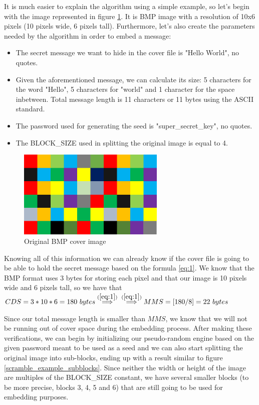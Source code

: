 \begin{multicols*}{2}
It is much easier to explain the algorithm using a simple example, so let's begin with the image represented in figure \ref{scramble_example_original_image}. It is BMP image with a resolution of 10x6 pixels (10 pixels wide, 6 pixels tall). Furthermore, let's also create the parameters needed by the algorithm in order to embed a message:
\begin{itemize}
  \item The secret message we want to hide in the cover file is "Hello World", no quotes.
  \item Given the aforementioned message, we can calculate its size: 5 characters for the word "Hello", 5 characters for "world" and 1 character for the space inbetween. Total message length is 11 characters or 11 bytes using the ASCII standard. 
  \item The password used for generating the seed is "super\_secret\_key", no quotes.
  \item The BLOCK\_SIZE used in splitting the original image is equal to 4.
\end{itemize}

\begin{figure}[H]
    \centering
    \includegraphics[width=7cm,keepaspectratio]{pics/bmp_scrambling/original_image}
    \caption{Original BMP cover image}
    \label{scramble_example_original_image}
\end{figure}

Knowing all of this information we can already know if the cover file is going to be able to hold the secret message based on the formula \ref{eq:1}. We know that the BMP format uses 3 bytes for storing each pixel and that our image is 10 pixels wide and 6 pixels tall, so we have that 
\\$CDS=3*10*6=180\ bytes \overset{(\ref{eq:1})}{ \implies }\\ \overset{(\ref{eq:1})}{ \implies } MMS=[180/8]=22\ bytes$

Since our total message length is smaller than $MMS$, we know that we will not be running out of cover space during the embedding process. After making these verifications, we can begin by initializing our pseudo-random engine based on the given password meant to be used as a seed and we can also start splitting the original image into sub-blocks, ending up with a result similar to figure \ref{scramble_example_subblocks}. Since neither the width or height of the image are multiples of the BLOCK\_SIZE constant, we have several smaller blocks (to be more precise, blocks 3, 4, 5 and 6) that are still going to be used for embedding purposes. 


\end{multicols*}
